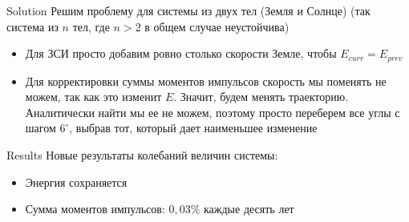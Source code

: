 \documentclass{beamer}
\begin{document}
\begin{frame}[fragile]{Solution}
  Решим проблему для системы из двух тел (Земля и Солнце) (так система из $n$ тел, где $n > 2$ в общем случае неустойчива)
  \begin{itemize}
    \item <2-> Для ЗСИ просто добавим ровно столько скорости Земле, чтобы $E_{curr} = E_{prev}$
    \item <3-> Для корректировки суммы моментов импульсов скорость мы поменять не можем, так
    как это изменит $E$. Значит, будем менять траекторию. Аналитически найти мы ее не можем, поэтому
    просто переберем все углы с шагом $6^\circ$, выбрав тот, который дает наименьшее изменение
  \end{itemize}
\end{frame}

\begin{frame}[fragile]{Results}
  Новые результаты колебаний величин системы:
  \begin{itemize}
    \item <2-> Энергия сохраняется
    \item <3-> Сумма моментов импульсов: $0,03\%$ каждые десять лет
  \end{itemize}  
\end{frame}
\end{document}
